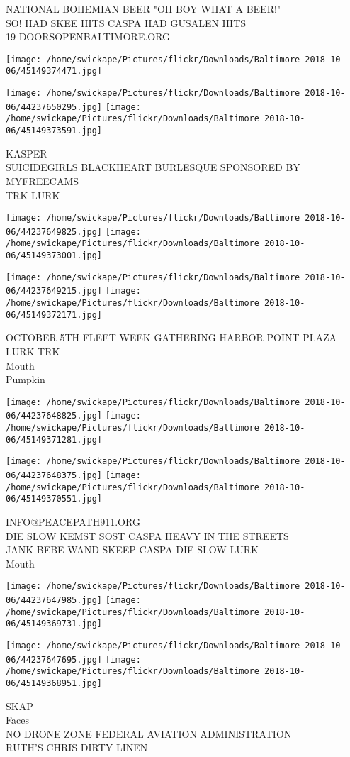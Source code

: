 \documentclass[10pt,letterpaper]{article}
\begin{document}
NATIONAL BOHEMIAN BEER "OH BOY WHAT A BEER!"\\
SO!  HAD SKEE HITS CASPA HAD GUSALEN HITS\\
19 DOORSOPENBALTIMORE.ORG
\pagebreak

\texttt{[image: /home/swickape/Pictures/flickr/Downloads/Baltimore 2018-10-06/45149374471.jpg]}

\vspace{0.25in}
\texttt{[image: /home/swickape/Pictures/flickr/Downloads/Baltimore 2018-10-06/44237650295.jpg]}
\texttt{[image: /home/swickape/Pictures/flickr/Downloads/Baltimore 2018-10-06/45149373591.jpg]}

KASPER\\
SUICIDEGIRLS BLACKHEART BURLESQUE SPONSORED BY MYFREECAMS\\
TRK LURK
\pagebreak

\texttt{[image: /home/swickape/Pictures/flickr/Downloads/Baltimore 2018-10-06/44237649825.jpg]}
\texttt{[image: /home/swickape/Pictures/flickr/Downloads/Baltimore 2018-10-06/45149373001.jpg]}

\texttt{[image: /home/swickape/Pictures/flickr/Downloads/Baltimore 2018-10-06/44237649215.jpg]}
\texttt{[image: /home/swickape/Pictures/flickr/Downloads/Baltimore 2018-10-06/45149372171.jpg]}

OCTOBER 5TH FLEET WEEK GATHERING HARBOR POINT PLAZA\\
LURK TRK\\
Mouth\\
Pumpkin
\pagebreak

\texttt{[image: /home/swickape/Pictures/flickr/Downloads/Baltimore 2018-10-06/44237648825.jpg]}
\texttt{[image: /home/swickape/Pictures/flickr/Downloads/Baltimore 2018-10-06/45149371281.jpg]}

\texttt{[image: /home/swickape/Pictures/flickr/Downloads/Baltimore 2018-10-06/44237648375.jpg]}
\texttt{[image: /home/swickape/Pictures/flickr/Downloads/Baltimore 2018-10-06/45149370551.jpg]}

INFO@PEACEPATH911.ORG\\
DIE SLOW KEMST SOST CASPA HEAVY IN THE STREETS\\
JANK BEBE WAND SKEEP CASPA DIE SLOW LURK\\
Mouth
\pagebreak

\texttt{[image: /home/swickape/Pictures/flickr/Downloads/Baltimore 2018-10-06/44237647985.jpg]}
\texttt{[image: /home/swickape/Pictures/flickr/Downloads/Baltimore 2018-10-06/45149369731.jpg]}

\texttt{[image: /home/swickape/Pictures/flickr/Downloads/Baltimore 2018-10-06/44237647695.jpg]}
\texttt{[image: /home/swickape/Pictures/flickr/Downloads/Baltimore 2018-10-06/45149368951.jpg]}

SKAP\\
Faces\\
NO DRONE ZONE FEDERAL AVIATION ADMINISTRATION\\
RUTH'S CHRIS DIRTY LINEN
\pagebreak
\end{document}
